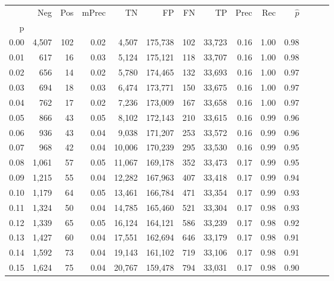 \begin{tabular}{rrrrrrrrrrrrrr}
\toprule
{} &    Neg &  Pos & mPrec &       TN &       FP &      FN &      TP &  Prec &   Rec & $\hat{p}$ \\
p    &        &      &       &          &          &         &         &       &       &           \\
\midrule
0.00 &  4,507 &  102 &  0.02 &    4,507 &  175,738 &     102 &  33,723 &  0.16 &  1.00 &      0.98 \\
0.01 &    617 &   16 &  0.03 &    5,124 &  175,121 &     118 &  33,707 &  0.16 &  1.00 &      0.98 \\
0.02 &    656 &   14 &  0.02 &    5,780 &  174,465 &     132 &  33,693 &  0.16 &  1.00 &      0.97 \\
0.03 &    694 &   18 &  0.03 &    6,474 &  173,771 &     150 &  33,675 &  0.16 &  1.00 &      0.97 \\
0.04 &    762 &   17 &  0.02 &    7,236 &  173,009 &     167 &  33,658 &  0.16 &  1.00 &      0.97 \\
0.05 &    866 &   43 &  0.05 &    8,102 &  172,143 &     210 &  33,615 &  0.16 &  0.99 &      0.96 \\
0.06 &    936 &   43 &  0.04 &    9,038 &  171,207 &     253 &  33,572 &  0.16 &  0.99 &      0.96 \\
0.07 &    968 &   42 &  0.04 &   10,006 &  170,239 &     295 &  33,530 &  0.16 &  0.99 &      0.95 \\
0.08 &  1,061 &   57 &  0.05 &   11,067 &  169,178 &     352 &  33,473 &  0.17 &  0.99 &      0.95 \\
0.09 &  1,215 &   55 &  0.04 &   12,282 &  167,963 &     407 &  33,418 &  0.17 &  0.99 &      0.94 \\
0.10 &  1,179 &   64 &  0.05 &   13,461 &  166,784 &     471 &  33,354 &  0.17 &  0.99 &      0.93 \\
0.11 &  1,324 &   50 &  0.04 &   14,785 &  165,460 &     521 &  33,304 &  0.17 &  0.98 &      0.93 \\
0.12 &  1,339 &   65 &  0.05 &   16,124 &  164,121 &     586 &  33,239 &  0.17 &  0.98 &      0.92 \\
0.13 &  1,427 &   60 &  0.04 &   17,551 &  162,694 &     646 &  33,179 &  0.17 &  0.98 &      0.91 \\
0.14 &  1,592 &   73 &  0.04 &   19,143 &  161,102 &     719 &  33,106 &  0.17 &  0.98 &      0.91 \\
0.15 &  1,624 &   75 &  0.04 &   20,767 &  159,478 &     794 &  33,031 &  0.17 &  0.98 &      0.90 \\

\end{tabular}
